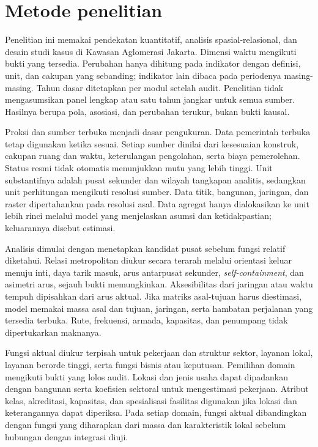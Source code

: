 \documentclass[11pt,a4paper,oneside,openany,indonesian]{report}
\begin{document}
\section{Metode penelitian}

Penelitian ini memakai pendekatan kuantitatif, analisis spasial-relasional, dan desain studi kasus di Kawasan Aglomerasi Jakarta. Dimensi waktu mengikuti bukti yang tersedia. Perubahan hanya dihitung pada indikator dengan definisi, unit, dan cakupan yang sebanding; indikator lain dibaca pada periodenya masing-masing. Tahun dasar ditetapkan per modul setelah audit. Penelitian tidak mengasumsikan panel lengkap atau satu tahun jangkar untuk semua sumber. Hasilnya berupa pola, asosiasi, dan perubahan terukur, bukan bukti kausal.

Proksi dan sumber terbuka menjadi dasar pengukuran. Data pemerintah terbuka tetap digunakan ketika sesuai. Setiap sumber dinilai dari kesesuaian konstruk, cakupan ruang dan waktu, keterulangan pengolahan, serta biaya pemerolehan. Status resmi tidak otomatis menunjukkan mutu yang lebih tinggi. Unit substantifnya adalah pusat sekunder dan wilayah tangkapan analitis, sedangkan unit perhitungan mengikuti resolusi sumber. Data titik, bangunan, jaringan, dan raster dipertahankan pada resolusi asal. Data agregat hanya dialokasikan ke unit lebih rinci melalui model yang menjelaskan asumsi dan ketidakpastian; keluarannya disebut estimasi.

Analisis dimulai dengan menetapkan kandidat pusat sebelum fungsi relatif diketahui. Relasi metropolitan diukur secara terarah melalui orientasi keluar menuju inti, daya tarik masuk, arus antarpusat sekunder, \emph{self-containment}, dan asimetri arus, sejauh bukti memungkinkan. Aksesibilitas dari jaringan atau waktu tempuh dipisahkan dari arus aktual. Jika matriks asal-tujuan harus diestimasi, model memakai massa asal dan tujuan, jaringan, serta hambatan perjalanan yang tersedia terbuka. Rute, frekuensi, armada, kapasitas, dan penumpang tidak dipertukarkan maknanya.

Fungsi aktual diukur terpisah untuk pekerjaan dan struktur sektor, layanan lokal, layanan berorde tinggi, serta fungsi bisnis atau keputusan. Pemilihan domain mengikuti bukti yang lolos audit. Lokasi dan jenis usaha dapat dipadankan dengan bangunan serta koefisien sektoral untuk mengestimasi pekerjaan. Atribut kelas, akreditasi, kapasitas, dan spesialisasi fasilitas digunakan jika lokasi dan keterangannya dapat diperiksa. Pada setiap domain, fungsi aktual dibandingkan dengan fungsi yang diharapkan dari massa dan karakteristik lokal sebelum hubungan dengan integrasi diuji.
\end{document}
